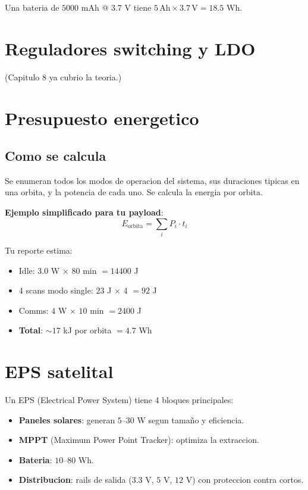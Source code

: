 \documentclass[11pt,a4paper,oneside,openright]{book}
\begin{document}
Una bateria de $5000$ mAh @ $3.7$ V tiene $5\,\text{Ah} \times 3.7\,\text{V} = 18.5$ Wh.

\chapter{Reguladores switching y LDO}

(Capitulo 8 ya cubrio la teoria.)

\chapter{Presupuesto energetico}

\section{Como se calcula}

Se enumeran todos los modos de operacion del sistema, sus duraciones
tipicas en una orbita, y la potencia de cada uno. Se calcula la energia
por orbita.

\textbf{Ejemplo simplificado para tu payload}:
\[
E_{\text{orbita}} = \sum_i P_i \cdot t_i
\]

Tu reporte estima:
\begin{itemize}[leftmargin=2em]
  \item Idle: $3.0$ W $\times$ $80$ min $= 14400$ J
  \item 4 scans modo single: $23$ J $\times$ 4 $= 92$ J
  \item Comms: $4$ W $\times$ $10$ min $= 2400$ J
  \item \textbf{Total}: $\sim 17$ kJ por orbita $= 4.7$ Wh
\end{itemize}

\chapter{EPS satelital}

Un EPS (Electrical Power System) tiene 4 bloques principales:

\begin{itemize}[leftmargin=2em]
  \item \textbf{Paneles solares}: generan $5$--$30$ W segun tamaño y
        eficiencia.
  \item \textbf{MPPT} (Maximum Power Point Tracker): optimiza la extraccion.
  \item \textbf{Bateria}: $10$--$80$ Wh.
  \item \textbf{Distribucion}: rails de salida ($3.3$ V, $5$ V, $12$ V) con
        proteccion contra cortos.
\end{itemize}
\end{document}
